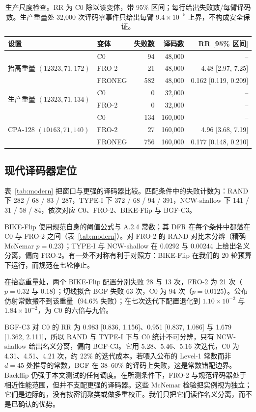 \begin{table}[!t]
\centering
\small
\caption{生产尺度检查。RR 为 C0 除以该变体，带 95\% 区间；每行给出失败数/每臂译码数。生产重量处 32{,}000 次译码零事件只给出每臂 $9.4\times10^{-5}$ 上界，不构成安全保证。}
\label{tab:added}
\begin{tabular}{llrrr}
\toprule
设置 & 变体 & 失败数 & 译码数 & RR [95\% 区间] \\
\midrule
\multirow{3}{*}{抬高重量 $(12323,71,172)$} & C0 & 94 & 48{,}000 & -- \\
 & FRO-2 & 21 & 48{,}000 & 4.48 [2.97, 7.25] \\
 & FRONEG & 582 & 48{,}000 & 0.162 [0.119, 0.209] \\
\midrule
\multirow{2}{*}{生产重量 $(12323,71,134)$} & C0 & 0 & 32{,}000 & -- \\
 & FRO-2 & 0 & 32{,}000 & -- \\
\midrule
\multirow{3}{*}{CPA-128 $(10163,71,140)$} & C0 & 134 & 160{,}000 & -- \\
 & FRO-2 & 27 & 160{,}000 & 4.96 [3.68, 7.19] \\
 & FRONEG & 756 & 160{,}000 & 0.177 [0.148, 0.210] \\
\bottomrule
\end{tabular}
\end{table}

\subsection{现代译码器定位}\label{sec:modern}

表~\ref{tab:modern} 把窗口与更强的译码器比较。匹配条件中的失败计数为：RAND 下 282 / 68 / 83 / 287，TYPE-I 下 372 / 68 / 94 / 391，NCW-shallow 下 141 / 31 / 58 / 84，依次对应 C0、FRO-2、BIKE-Flip 与 BGF-C3。

BIKE-Flip 使用规范自身的阈值公式与 A.2.4 常数；其 DFR 在每个条件中都落在 C0 与 FRO-2 之间（表~\ref{tab:modern}）。对 FRO-2 的 RAND 对比未分辨（精确 McNemar $p=0.23$）；TYPE-I 与 NCW-shallow 在 $0.0292$ 与 $0.00244$ 上给出名义分离，偏向 FRO-2。有一处不对称有利于对照方：BIKE-Flip 在我们的 20 轮预算下运行，而规范在七轮停止。

在抬高重量处，两个 BIKE-Flip 配置分别失败 28 与 13 次，FRO-2 为 21 次（$p=0.32$ 与 $0.18$）；切线拟合 BGF 失败 63 次，C0 为 94 次（$p=0.0125$）。公布仿射常数搬不到该重量（94.6\% 失败）；在七次迭代下配置退化到 $1.10\times10^{-2}$ 与 $1.84\times10^{-2}$，为 C0 的六倍与九倍。

BGF-C3 对 C0 的 RR 为 0.983 [0.836, 1.156]、0.951 [0.837, 1.086] 与 1.679 [1.362, 2.111]，所以 RAND 与 TYPE-I 下与 C0 统计不可分辨，只有 NCW-shallow 给出名义分离，偏向 BGF-C3。它用 5.28、5.46、5.16 次迭代，C0 为 4.31、4.51、4.21 次，约 22\% 的迭代成本。若喂入公布的 Level-1 常数而非 $d=45$ 处推导的常数，BGF 在 38--60\% 的译码上失败，这是常数错配边界。Backflip 仍强于本文测试的任何调度。在所测条件下，FRO-2 与规范译码器处于相近性能范围，但并不支配更强的译码器。这些 McNemar 检验把实例视为独立；它们是边际的，没有按密钥聚类或做多重校正。我们只把它们读作名义分离，而不是已确认的优势。

